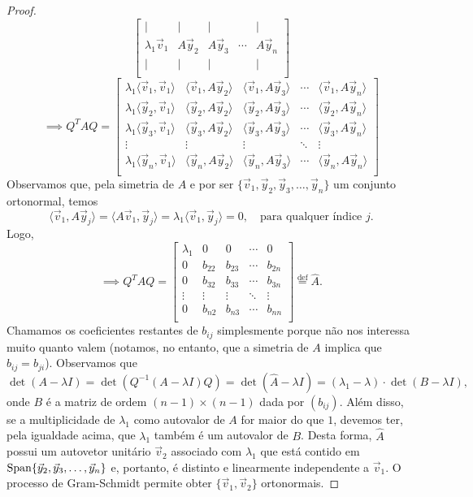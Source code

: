 \documentclass[../livro.tex]{subfiles}
\begin{document}
\begin{proof}
\[\begin{bmatrix}
	| & | & | & & | \\
	\lambda_1 \vec{v}_1 & A \vec{y}_2 & A \vec{y}_3 & \cdots &  A\vec{y}_n \\
	| & | & | & & | \\
	\end{bmatrix}
	\]
	\[
	\implies Q^TAQ =
	\begin{bmatrix}
	\lambda_1\langle \vec{v}_1, \vec{v}_1 \rangle & \langle \vec{v}_1, A\vec{y}_2 \rangle & \langle \vec{v}_1, A\vec{y}_3 \rangle & \cdots & \langle \vec{v}_1, A\vec{y}_n \rangle \\
	\lambda_1\langle \vec{y}_2, \vec{v}_1 \rangle & \langle \vec{y}_2, A\vec{y}_2 \rangle & \langle \vec{y}_2, A\vec{y}_3 \rangle & \cdots & \langle \vec{y}_2, A\vec{y}_n \rangle \\
	\lambda_1\langle \vec{y}_3, \vec{v}_1 \rangle & \langle \vec{y}_3, A\vec{y}_2 \rangle & \langle \vec{y}_3, A\vec{y}_3 \rangle & \cdots & \langle \vec{y}_3, A\vec{y}_n \rangle \\
	\vdots & \vdots & \vdots & \ddots & \vdots \\
	\lambda_1\langle \vec{y}_n, \vec{v}_1 \rangle & \langle \vec{y}_n, A\vec{y}_2 \rangle & \langle \vec{y}_n, A\vec{y}_3 \rangle & \cdots & \langle \vec{y}_n, A\vec{y}_n \rangle \\
	\end{bmatrix}
	\] Observamos que, pela simetria de $A$ e por ser $	\{ \vec{v}_1, \vec{y}_2, \vec{y}_3, \dots, \vec{y}_n \}$ um conjunto ortonormal, temos 
	\[
	\langle \vec{v}_1, A\vec{y}_j \rangle = \langle A\vec{v}_1, \vec{y}_j \rangle = \lambda_1 \langle \vec{v}_1, \vec{y}_j \rangle = 0, \quad \text{para qualquer índice } j.
	\]Logo,
	\[
	\implies Q^TAQ =
	\begin{bmatrix}
	\lambda_1 & 0 & 0 & \cdots & 0 \\
	0 & b_{22} & b_{23} & \cdots & b_{2n} \\
	0 & b_{32} & b_{33} & \cdots & b_{3n} \\
	\vdots & \vdots & \vdots & \ddots & \vdots \\
	0 & b_{n2} & b_{n3} & \cdots & b_{nn} \\
	\end{bmatrix} \stackrel{\text{def}}{=} \hat{A}.
	\] Chamamos os coeficientes restantes de $b_{ij}$ simplesmente porque não nos interessa muito quanto valem (notamos, no entanto, que a simetria de $A$ implica que $b_{ij} = b_{ji}$). Observamos que 
	\[
	\det \left( A - \lambda I \right) = \det \left( Q^{-1} (A - \lambda I) Q \right) =	\det \left( \hat{A} - \lambda I \right) = (\lambda_1 - \lambda) \cdot \det (B - \lambda I),
	\] onde $B$ é a matriz de ordem $(n-1)\times (n-1)$ dada por $(b_{ij})$. Além disso, se a multiplicidade de $\lambda_1$ como autovalor de $A$ for maior do que $1$, devemos ter, pela igualdade acima, que $\lambda_1$ também é um autovalor de $B$. Desta forma, $\hat{A}$ possui um autovetor unitário $\vec{v}_2$ associado com $\lambda_1$ que está contido em $\operatorname{Span} \{ \vec{y}_2, \vec{y}_3, \dots, \vec{y}_n \}$ e, portanto, é distinto e linearmente independente a $\vec{v}_1$. O processo de Gram-Schmidt permite obter $\{\vec{v}_1, \vec{v}_2\}$ ortonormais.
	

\end{proof}
\end{document}
